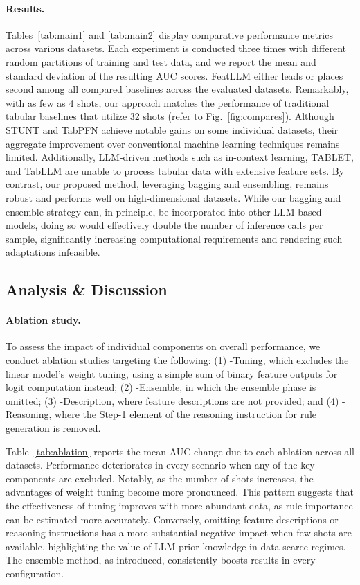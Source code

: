 {\vspace*{-0.12in}
\paragraph{Results.}
Tables~\ref{tab:main1} and \ref{tab:main2} display comparative performance metrics across various datasets. Each experiment is conducted three times with different random partitions of training and test data, and we report the mean and standard deviation of the resulting AUC scores. \textsf{FeatLLM} either leads or places second among all compared baselines across the evaluated datasets. Remarkably, with as few as 4 shots, our approach matches the performance of traditional tabular baselines that utilize 32 shots (refer to Fig.~\ref{fig:compares}). Although STUNT and TabPFN achieve notable gains on some individual datasets, their aggregate improvement over conventional machine learning techniques remains limited. Additionally, LLM-driven methods such as in-context learning, TABLET, and TabLLM are unable to process tabular data with extensive feature sets. By contrast, our proposed method, leveraging bagging and ensembling, remains robust and performs well on high-dimensional datasets. While our bagging and ensemble strategy can, in principle, be incorporated into other LLM-based models, doing so would effectively double the number of inference calls per sample, significantly increasing computational requirements and rendering such adaptations infeasible.

\subsection{Analysis \& Discussion}
\label{sec:analysis}
\paragraph{Ablation study.} To assess the impact of individual components on overall performance, we conduct ablation studies targeting the following: (1) \textsf{-Tuning}, which excludes the linear model’s weight tuning, using a simple sum of binary feature outputs for logit computation instead; (2) \textsf{-Ensemble}, in which the ensemble phase is omitted; (3) \textsf{-Description}, where feature descriptions are not provided; and (4) \textsf{-Reasoning}, where the Step-1 element of the reasoning instruction for rule generation is removed.

Table~\ref{tab:ablation} reports the mean AUC change due to each ablation across all datasets. Performance deteriorates in every scenario when any of the key components are excluded. Notably, as the number of shots increases, the advantages of weight tuning become more pronounced. This pattern suggests that the effectiveness of tuning improves with more abundant data, as rule importance can be estimated more accurately. Conversely, omitting feature descriptions or reasoning instructions has a more substantial negative impact when few shots are available, highlighting the value of LLM prior knowledge in data-scarce regimes. The ensemble method, as introduced, consistently boosts results in every configuration.

}
